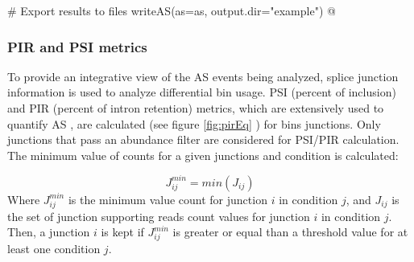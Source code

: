 \documentclass{article}
\begin{document}
# Export results to files
writeAS(as=as, output.dir="example")
@

\subsubsection{PIR and PSI metrics}
\label{sec:psir}
To provide an integrative view of the AS events being analyzed, splice junction
information is used to analyze differential bin usage. PSI (percent of
inclusion) and PIR (percent of intron retention) metrics, which are extensively
used to quantify AS \cite{pmid21057496}, are calculated (see figure
\ref{fig:pirEq} ) for bins junctions. Only junctions that pass an abundance
filter are considered for PSI/PIR calculation. The minimum value of
counts for a given junctions and condition is calculated:

\begin{equation}
  J^{min}_{ij} = min( J_{ij} )
\end{equation}
Where $J^{min}_{ij}$ is the minimum value count for junction $i$ in condition
$j$, and $J_{ij}$ is the set of junction supporting reads count values for
junction $i$ in condition $j$. Then, a junction $i$ is kept if $J^{min}_{ij}$ is 
greater or equal than a threshold value for at least one condition $j$.
\end{document}
